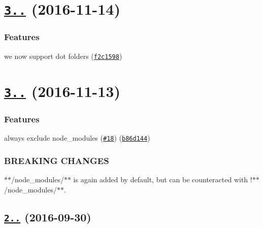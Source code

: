\label{_3.1.0}%
 \section*{\href{https://github.com/istanbuljs/test-exclude/compare/v3.0.0...v3.1.0}{\tt 3..} (2016-\/11-\/14)}

\subsubsection*{Features}


\begin{DoxyItemize}
\item we now support dot folders (\href{https://github.com/istanbuljs/test-exclude/commit/f2c1598}{\tt f2c1598})
\end{DoxyItemize}

\label{_3.0.0}%
 \section*{\href{https://github.com/istanbuljs/test-exclude/compare/v2.1.3...v3.0.0}{\tt 3..} (2016-\/11-\/13)}

\subsubsection*{Features}


\begin{DoxyItemize}
\item always exclude node\+\_\+modules (\href{https://github.com/istanbuljs/test-exclude/issues/18}{\tt \#18}) (\href{https://github.com/istanbuljs/test-exclude/commit/b86d144}{\tt b86d144})
\end{DoxyItemize}

\subsubsection*{B\+R\+E\+A\+K\+I\+NG C\+H\+A\+N\+G\+ES}


\begin{DoxyItemize}
\item {\ttfamily $\ast$$\ast$/node\+\_\+modules/$\ast$$\ast$} is again added by default, but can be counteracted with {\ttfamily !$\ast$$\ast$/node\+\_\+modules/$\ast$$\ast$}.
\end{DoxyItemize}

\label{_2.1.3}%
 \subsection*{\href{https://github.com/istanbuljs/test-exclude/compare/v2.1.2...v2.1.3}{\tt 2..} (2016-\/09-\/30)}

